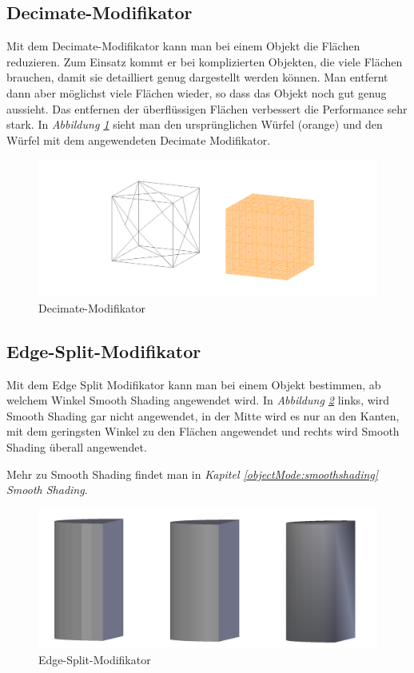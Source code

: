 \subsection{Decimate-Modifikator\citep{blender:decimate_modifier}}
\label{Decimate:heading}
Mit dem Decimate-Modifikator kann man bei einem Objekt die Flächen reduzieren. Zum Einsatz kommt er bei komplizierten
Objekten, die viele Flächen brauchen, damit sie detailliert genug dargestellt werden können. Man entfernt dann aber möglichst viele Flächen
wieder, so dass das Objekt noch gut genug aussieht. Das entfernen der überflüssigen Flächen verbessert die Performance sehr stark.
In \textit{Abbildung \ref{modifikatoren:image6}} sieht man den ursprünglichen Würfel (orange) und den Würfel mit dem angewendeten
Decimate Modifikator.
\begin{figure}[h]
    \centering
    \includegraphics[width=.8\textwidth]{images/Modifikatoren-Decimate.png}
    \caption{Decimate-Modifikator}
    \label{modifikatoren:image6}
\end{figure}

\subsection{Edge-Split-Modifikator\citep{blender:edgesplit_modifier}}
\label{Edge_Split:heading}
Mit dem Edge Split Modifikator kann man bei einem Objekt bestimmen, ab welchem Winkel Smooth Shading angewendet wird.
In \textit{Abbildung \ref{modifikatoren:image7}} links, wird Smooth Shading gar nicht angewendet, in der Mitte wird es nur an
den Kanten, mit dem geringsten Winkel zu den Flächen angewendet und rechts wird Smooth Shading überall angewendet.

Mehr zu Smooth Shading findet man in \textit{Kapitel \ref{objectMode:smoothshading} \dq Smooth Shading\dq}.
\begin{figure}[h]
    \centering
    \includegraphics[width=.8\textwidth]{images/Modifikatoren-Edgesplit.png}
    \caption{Edge-Split-Modifikator}
    \label{modifikatoren:image7}
\end{figure}